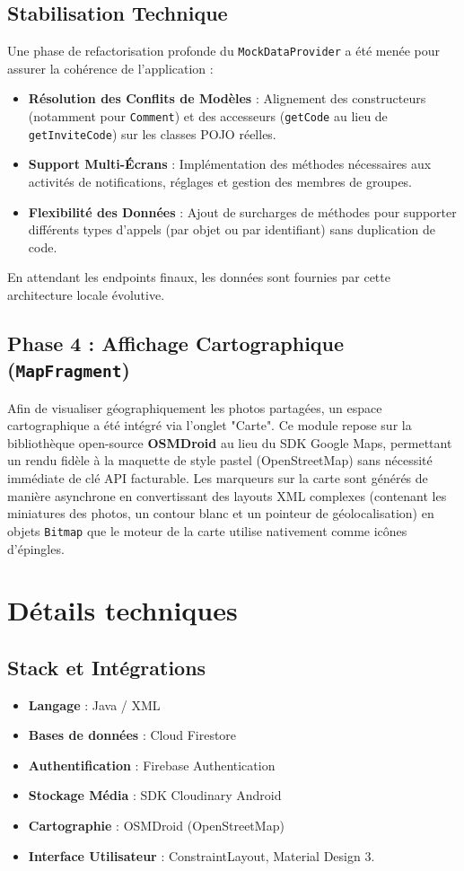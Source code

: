\documentclass{article}
\begin{document}
\subsection{Stabilisation Technique}
Une phase de refactorisation profonde du \texttt{MockDataProvider} a été menée pour assurer la cohérence de l'application :
\begin{itemize}
    \item \textbf{Résolution des Conflits de Modèles} : Alignement des constructeurs (notamment pour \texttt{Comment}) et des accesseurs (\texttt{getCode} au lieu de \texttt{getInviteCode}) sur les classes POJO réelles.
    \item \textbf{Support Multi-Écrans} : Implémentation des méthodes nécessaires aux activités de notifications, réglages et gestion des membres de groupes.
    \item \textbf{Flexibilité des Données} : Ajout de surcharges de méthodes pour supporter différents types d'appels (par objet ou par identifiant) sans duplication de code.
\end{itemize}

En attendant les endpoints finaux, les données sont fournies par cette architecture locale évolutive.

\subsection{Phase 4 : Affichage Cartographique (\texttt{MapFragment})}
Afin de visualiser géographiquement les photos partagées, un espace cartographique a été intégré via l'onglet "Carte". Ce module repose sur la bibliothèque open-source \textbf{OSMDroid} au lieu du SDK Google Maps, permettant un rendu fidèle à la maquette de style pastel (OpenStreetMap) sans nécessité immédiate de clé API facturable.
Les marqueurs sur la carte sont générés de manière asynchrone en convertissant des layouts XML complexes (contenant les miniatures des photos, un contour blanc et un pointeur de géolocalisation) en objets \texttt{Bitmap} que le moteur de la carte utilise nativement comme icônes d'épingles.

\section{Détails techniques}
\subsection{Stack et Intégrations}
\begin{itemize}
    \item \textbf{Langage} : Java / XML
    \item \textbf{Bases de données} : Cloud Firestore
    \item \textbf{Authentification} : Firebase Authentication
    \item \textbf{Stockage Média} : SDK Cloudinary Android 
    \item \textbf{Cartographie} : OSMDroid (OpenStreetMap)
    \item \textbf{Interface Utilisateur} : ConstraintLayout, Material Design 3.
\end{itemize}
\end{document}
